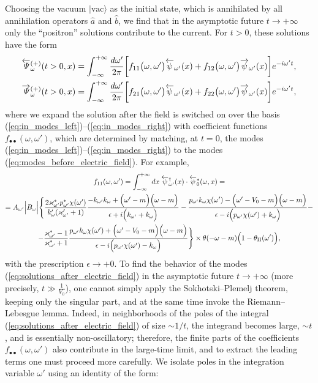 \documentclass[12pt]{article}
\newcommand\beq{\begin{equation}}
\newcommand\eeq{\end{equation}}
\def\kw{k_{\omega}} \def\pw{p_{\omega}}
\def\w{\omega}
\def\II{\mathrm{II}}
\def\kwh{k_{\omega'}} \def\pwh{p_{\omega'}}
\def\kappawh{\varkappa_{\omega'}}
\numberwithin{equation}{section}
\begin{document}
Choosing the vacuum $\Big|\text{vac}\Big\rangle$ as the initial state, which is annihilated by all annihilation operators $\widehat{a}$ and $\widehat{b}$, we find that in the asymptotic future $t\to+\infty$ only the ``positron'' solutions contribute to the current. For $t>0$, these solutions have the form
\beq\label{eq:solutions_after_electric_field}
\begin{aligned}
    \overleftarrow{\mathit{\Psi}}\phantom{\empty}^{(+)}_{\w}(t>0,x) = \int_{-\infty}^{+\infty}\frac{d\w'}{2\pi}\bigg[f_{11}\big(\w,\w'\big)\overleftarrow{\psi}_{\w'}(x) + f_{12}\big(\w,\w'\big)\overrightarrow{\psi}_{\w'}(x) \bigg]e^{-i\w't},
    \\
    \overrightarrow{\mathit{\Psi}}\phantom{\empty}^{(+)}_{\w}(t>0,x) = \int_{-\infty}^{+\infty}\frac{d\w'}{2\pi}\bigg[f_{21}\big(\w,\w'\big)\overleftarrow{\psi}_{\w'}(x) + f_{22}\big(\w,\w'\big)\overrightarrow{\psi}_{\w'}(x) \bigg]e^{-i\w't},
\end{aligned}
\eeq
where we expand the solution after the field is switched on over the basis (\ref{eq:in_modes_left})–(\ref{eq:in_modes_right}) with coefficient functions $f_{\bullet\bullet}(\w,\w')$, which are determined by matching, at $t=0$, the modes (\ref{eq:in_modes_left})–(\ref{eq:in_modes_right}) to the modes (\ref{eq:modes_before_electric_field}). For example,
\begin{gather}
\label{eq:example_f_coefficient}
    f_{11}(\w,\w') = \int_{-\infty}^{+\infty}dx\;\overleftarrow{\psi}\phantom{\empty}^{\dagger}_{\w'}(x)\cdot \overleftarrow{\psi}_{0}^{*}(\w,x) =
    \\ \nonumber
    =A_{\w'}\Big|B_{\w}\Big|\Bigg\{  
    \frac{2\kappawh^{*}\pwh^{*}\chi(\w')}{\kw'(\kappawh'+1)}\frac{-\kwh\kw+\Big(\w'-m\Big)\Big(\w-m\Big)}{\epsilon+i\Big(\kwh+\kw\Big)}- 
    \frac{\pwh\kw\chi(\w')-\Big(\w'-V_0-m\Big)\Big(\w-m\Big)}{\epsilon-i\Big(\pwh\chi(\w')+\kw\Big)} -
    \\ \nonumber
    -\frac{\kappawh^{*}-1}{\kappawh^{*}+1}\frac{\pwh\kw\chi(\w')+\Big(\w'-V_0-m\Big)\Big(\w-m\Big)}{\epsilon-i\Big(\pwh\chi(\w')-\kw\Big)}
    \Bigg\}\times\theta(-\w-m)\Big(1-\theta_{\II}(\w')\Big),
\end{gather}
with the prescription $\epsilon\rightarrow+0$. To find the behavior of the modes (\ref{eq:solutions_after_electric_field}) in the asymptotic future $t\rightarrow+\infty$ (more precisely, $t\gg\frac{1}{V_0}$), one cannot simply apply the Sokhotski–Plemelj theorem, keeping only the singular part, and at the same time invoke the Riemann–Lebesgue lemma. Indeed, in neighborhoods of the poles of the integral (\ref{eq:solutions_after_electric_field}) of size $\sim 1/t$, the integrand becomes large, $\sim t$, and is essentially non-oscillatory; therefore, the finite parts of the coefficients $f_{\bullet\bullet}(\w,\w')$ also contribute in the large-time limit, and to extract the leading terms one must proceed more carefully. We isolate poles in the integration variable $\w'$ using an identity of the form:
\end{document}
